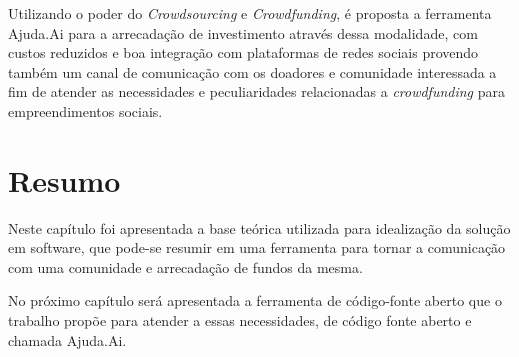 Utilizando o poder do \emph{Crowdsourcing} e \emph{Crowdfunding}, é proposta a ferramenta Ajuda.Ai para a arrecadação de investimento através dessa modalidade, com custos reduzidos e boa integração com plataformas de redes sociais provendo também um canal de comunicação com os doadores e comunidade interessada a fim de atender as necessidades e peculiaridades relacionadas a \emph{crowdfunding} para empreendimentos sociais.



\section*{Resumo}
Neste capítulo foi apresentada a base teórica utilizada para idealização da solução em software, que pode-se resumir em uma ferramenta para tornar a comunicação com uma comunidade e arrecadação de fundos da mesma.

No próximo capítulo será apresentada a ferramenta de código-fonte aberto que o trabalho propõe para atender a essas necessidades, de código fonte aberto e chamada Ajuda.Ai.